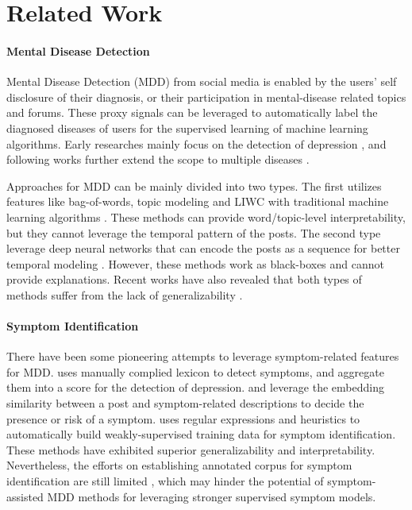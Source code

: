 \section{Related Work}

\paragraph{Mental Disease Detection} Mental Disease Detection (MDD) from social media is enabled by the users' self disclosure of their diagnosis, or their participation in mental-disease related topics and forums. These proxy signals can be leveraged to automatically label the diagnosed diseases of users for the supervised learning of machine learning algorithms. Early researches mainly focus on the detection of depression \citep{de2013predicting}, and following works further extend the scope to multiple diseases \citep{coppersmith2015adhd,cohan2018smhd}. 

Approaches for MDD can be mainly divided into two types. The first utilizes features like bag-of-words, topic modeling and LIWC \citep{pennebaker2001linguistic} with traditional machine learning algorithms \citep{shen2017depression,trotzek2018utilizing}. These methods can provide word/topic-level interpretability, but they cannot leverage the temporal pattern of the posts. The second type leverage deep neural networks that can encode the posts as a sequence for better temporal modeling \citep{yates2017depression,sekulic2019adapting,gui2019cooperative}. However, these methods work as black-boxes and cannot provide explanations. Recent works have also revealed that both types of methods suffer from the lack of generalizability \citep{harrigian2020models,nguyen2022improving}. 

\paragraph{Symptom Identification} There have been some pioneering attempts to leverage symptom-related features for MDD. \citet{karmen2015screening} uses manually complied lexicon to detect symptoms, and aggregate them into a score for the detection of depression. \citet{lee2021micromodels} and \citet{zhang22risky} leverage the embedding similarity between a post and symptom-related descriptions to decide the presence or risk of a symptom. \citet{nguyen2022improving} uses regular expressions and heuristics to automatically build weakly-supervised training data for symptom identification. These methods have exhibited superior generalizability and interpretability. Nevertheless, the efforts on establishing annotated corpus for symptom identification are still limited \citep{mowery2017understanding}, which may hinder the potential of symptom-assisted MDD methods for leveraging stronger supervised symptom models. 
